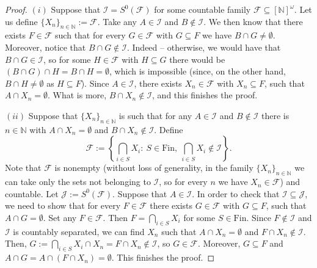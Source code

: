 \documentclass{amsart}
\theoremstyle{definition}
\theoremstyle{definition}
\newcommand{\N}{{\mathbb N}}
\newcommand{\Fin}{\textrm{Fin}}
\newcommand{\I}{\mathcal I}
\newcommand{\J}{\mathcal J}
\newcommand{\calF}{\mathcal{F}}
\newcommand{\InfSubs}{[\N]^{\omega}}
\newcommand{\MB}{S^0}  %
\begin{document}
\begin{proof}
$(i)$ Suppose that $\I = \MB(\calF)$ for some countable family $\calF \subseteq \InfSubs$. Let us define $\{X_n\}_{n\in\N} := \calF$. Take any $A\in\I$ and $B\notin\I$. We then know that there exists $F\in\calF$ such that for every $G\in\calF$ with $G\subseteq F$ we have $B\cap G \neq\emptyset$. Moreover, notice that $B\cap G \notin\I$. Indeed -- otherwise, we would have that $B\cap G \in\I$, so for some $H\in\calF$ with $H\subseteq G$ there would be $(B\cap G)\cap H = B\cap H =\emptyset$, which is impossible (since, on the other hand, $B\cap H \neq\emptyset$ as $H\subseteq F$). Since $A\in\I$, there exists $X_n \in \calF$ with $X_n \subseteq F$, such that $A\cap X_n = \emptyset$. What is more, $B\cap X_n\notin\I$, and this finishes the proof.

$(ii)$ Suppose that $\{X_n\}_{n\in\N}$ is such that for any $A\in\I$ and $B\notin\I$ there is $n\in\N$ with $A\cap X_n=\emptyset$ and $B\cap X_n\notin\I$. Define
$$\calF := \left\{\bigcap_{i\in S}{X_{i}} :\ S\in\Fin,\ \bigcap_{i\in S}{X_{i}}\notin\I\right\}.$$
Note that $\calF$ is nonempty (without loss of generality, in the family $\{X_n\}_{n\in\N}$ we can take only the sets not belonging to $\I$, so for every $n$ we have $X_n\in\calF$) and countable.
Let $\J := \MB(\calF)$. Suppose that $A\in\I$. In order to check that $\I \subseteq \J$, we need to show that for every $F\in\calF$ there exists $G\in\calF$ with $G\subseteq F$, such that $A\cap G =\emptyset$. Set any $F\in\calF$. Then $F = \bigcap_{i\in S}{X_{i}}$ for some $S\in\Fin$.
Since $F\notin\I$ and $\I$ is countably separated, we can find $X_n$ such that $A\cap X_n=\emptyset$ and $F\cap X_n\notin\I$. Then, $G := \bigcap_{i\in S}{X_{i}} \cap X_n = F\cap X_n \notin\I$,
so $G\in\calF$. Moreover, $G\subseteq F$ and $A \cap G = A \cap (F\cap X_n) =\emptyset$. This finishes the proof.
\end{proof}
\end{document}
